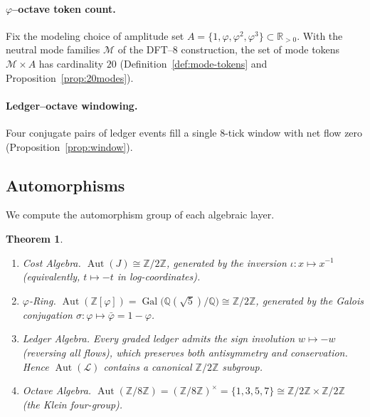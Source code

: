 \documentclass[11pt,reqno]{amsart}
\theoremstyle{plain}
\newtheorem{theorem}{Theorem}[section]
\theoremstyle{definition}
\theoremstyle{remark}
\newcommand{\phig}{\varphi}
\newcommand{\psig}{\bar\varphi} %
\newcommand{\Jcost}{J}
\newcommand{\RR}{\mathbb{R}}
\newcommand{\ZZ}{\mathbb{Z}}
\newcommand{\conj}{\sigma} %
\newcommand{\1}{\mathbf{1}}
\begin{document}
\paragraph{$\phig$--octave token count.}\label{prop:phi-octave} Fix the modeling choice of amplitude set $A=\{1,\phig,\phig^2,\phig^3\}\subset\RR_{>0}$. With the neutral mode families $\mathcal M$ of the DFT--$8$ construction, the set of mode tokens $\mathcal M\times A$ has cardinality $20$ (Definition~\ref{def:mode-tokens} and Proposition~\ref{prop:20modes}).

\paragraph{Ledger--octave windowing.}\label{prop:ledger-octave} Four conjugate pairs of ledger events fill a single $8$-tick window with net flow zero (Proposition~\ref{prop:window}).

\subsection{Automorphisms}\label{ssec:aut} We compute the automorphism group of each algebraic layer. \begin{theorem}\label{thm:aut}
\begin{enumerate}[nosep,label=\textup{(\alph*)}]
\item Cost Algebra. $\operatorname{Aut}(\Jcost)\cong\ZZ/2\ZZ$, generated by the inversion $\iota:x\mapsto x^{-1}$ (equivalently, $t\mapsto-t$ in log-coordinates).
\item $\phig$-Ring. $\operatorname{Aut}(\ZZ[\phig]) =\operatorname{Gal}\bigl(\mathbb{Q}(\sqrt5)\big/\mathbb{Q}\bigr) \cong\ZZ/2\ZZ$, generated by the Galois conjugation $\conj:\phig\mapsto\psig=1{-}\phig$.
\item Ledger Algebra. Every graded ledger admits the sign involution $w\mapsto-w$ (reversing all flows), which preserves both antisymmetry and conservation. Hence $\operatorname{Aut}(\mathcal L)$ contains a canonical $\ZZ/2\ZZ$ subgroup.
\item Octave Algebra. $\operatorname{Aut}(\ZZ/8\ZZ)=(\ZZ/8\ZZ)^\times=\{1,3,5,7\} \cong\ZZ/2\ZZ\times\ZZ/2\ZZ$ (the Klein four-group).
\end{enumerate}
\end{theorem}
\end{document}
